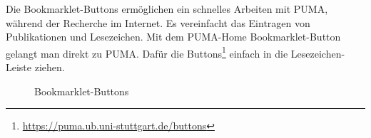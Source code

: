 Die Bookmarklet-Buttons ermöglichen ein schnelles Arbeiten mit PUMA, während der Recherche im Internet. Es vereinfacht das Eintragen von Publikationen und Lesezeichen. Mit dem PUMA-Home Bookmarklet-Button gelangt man direkt zu PUMA. Dafür die Buttons\footnote{\url{https://puma.ub.uni-stuttgart.de/buttons}} einfach in die Lesezeichen-Leiste ziehen.
\begin{figure}[h!]
 \centering
 \caption{Bookmarklet-Buttons}
 \label{fig:bookmarkletButtons}
\end{figure} 


